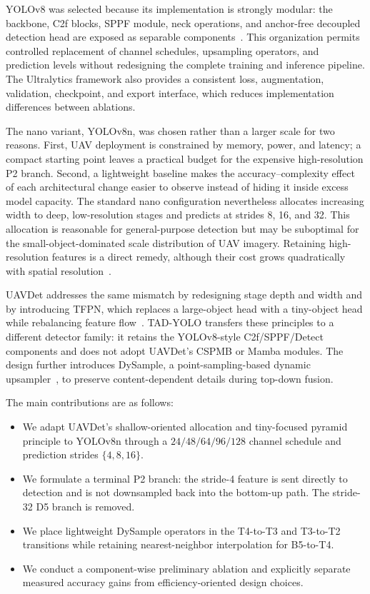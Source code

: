 \documentclass[conference]{IEEEtran}
\begin{document}
YOLOv8 was selected because its implementation is strongly modular: the
backbone, C2f blocks, SPPF module, neck operations, and anchor-free decoupled
detection head are exposed as separable components~\cite{jocher2023yolov8}.
This organization permits controlled replacement of channel schedules,
upsampling operators, and prediction levels without redesigning the complete
training and inference pipeline.  The Ultralytics framework also provides a
consistent loss, augmentation, validation, checkpoint, and export interface,
which reduces implementation differences between ablations.

The nano variant, YOLOv8n, was chosen rather than a larger scale for two
reasons.  First, UAV deployment is constrained by memory, power, and latency;
a compact starting point leaves a practical budget for the expensive
high-resolution P2 branch.  Second, a lightweight baseline makes the
accuracy--complexity effect of each architectural change easier to observe
instead of hiding it inside excess model capacity.  The standard nano
configuration nevertheless allocates increasing width to deep,
low-resolution stages and predicts at strides 8, 16, and 32.  This allocation
is reasonable for general-purpose detection but may be suboptimal for the
small-object-dominated scale distribution of UAV imagery.  Retaining
high-resolution features is a direct remedy, although their cost grows
quadratically with spatial resolution~\cite{yang2022querydet}.

UAVDet addresses the same mismatch by redesigning stage depth and width and by
introducing TFPN, which replaces a large-object head with a tiny-object head
while rebalancing feature flow~\cite{yang2026uavdet}.  TAD-YOLO transfers these
principles to a different detector family: it retains the YOLOv8-style
C2f/SPPF/Detect components and does not adopt UAVDet's CSPMB or Mamba modules.
The design further introduces DySample, a point-sampling-based dynamic
upsampler~\cite{liu2023dysample}, to preserve content-dependent details during
top-down fusion.

The main contributions are as follows:
\begin{itemize}
    \item We adapt UAVDet's shallow-oriented allocation and tiny-focused
    pyramid principle to YOLOv8n through a $24/48/64/96/128$ channel schedule
    and prediction strides $\{4,8,16\}$.
    \item We formulate a terminal P2 branch: the stride-4 feature is sent
    directly to detection and is not downsampled back into the bottom-up path.
    The stride-32 D5 branch is removed.
    \item We place lightweight DySample operators in the T4-to-T3 and
    T3-to-T2 transitions while retaining nearest-neighbor interpolation for
    B5-to-T4.
    \item We conduct a component-wise preliminary ablation and explicitly
    separate measured accuracy gains from efficiency-oriented design choices.
\end{itemize}
\end{document}
